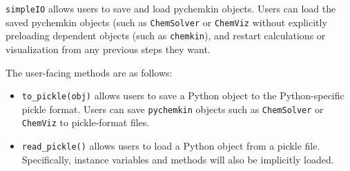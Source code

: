 \documentclass[12pt]{article}
\begin{document}
\texttt{simpleIO} allows users to save and load pychemkin objects. Users can load the saved pychemkin objects (such as \texttt{ChemSolver} or \texttt{ChemViz} without explicitly preloading dependent objects (such as \texttt{chemkin}), and restart calculations or visualization from any previous steps they want.

The user-facing methods are as follows:
\begin{itemize}

\item \texttt{to\_pickle(obj)} allows users to save a Python object to the Python-specific pickle format. Users can save \texttt{pychemkin} objects such as \texttt{ChemSolver} or \texttt{ChemViz} to pickle-format files.
\item \texttt{read\_pickle()} allows users to load a Python object from a pickle file. Specifically, instance variables and methods will also be implicitly loaded.

\end{itemize}
\end{document}
